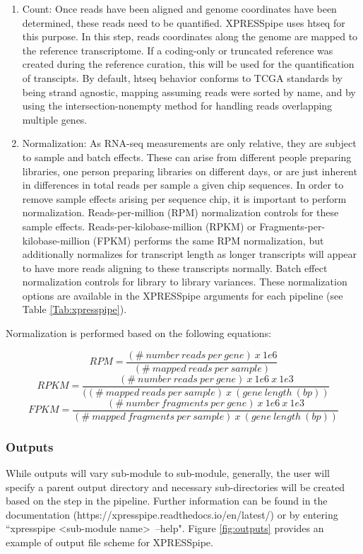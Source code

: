 \documentclass[11pt, a4paper, oneside]{article}
\begin{document}
\begin{enumerate}
  \item Count: Once reads have been aligned and genome coordinates have been determined, these reads need to be quantified. XPRESSpipe uses htseq{} for this purpose. In this step, reads coordinates along the genome are mapped to the reference transcriptome. If a coding-only or truncated reference was created during the reference curation, this will be used for the quantification of transcipts. By default, htseq behavior conforms to TCGA standards by being strand agnostic, mapping assuming reads were sorted by name, and by using the intersection-nonempty method for handling reads overlapping multiple genes.
  \item Normalization: As RNA-seq measurements are only relative, they are subject to sample and batch effects. These can arise from different people preparing libraries, one person preparing libraries on different days, or are just inherent in differences in total reads per sample a given chip sequences. In order to remove sample effects arising per sequence chip, it is important to perform normalization. Reads-per-million (RPM) normalization controls for these sample effects. Reads-per-kilobase-million (RPKM) or Fragments-per-kilobase-million (FPKM) performs the same RPM normalization, but additionally normalizes for transcript length as longer transcripts will appear to have more reads aligning to these transcripts normally. Batch effect normalization controls for library to library variances. These normalization options are available in the XPRESSpipe arguments for each pipeline (see Table \ref{Tab:xpresspipe}).
\end{enumerate}

Normalization is performed based on the following equations:

\[ RPM = \frac{(\#\ number\ reads\ per\ gene)\ x\ 1e6}{(\#\ mapped\ reads\ per\ sample)} \]
\[ RPKM = \frac{(\#\ number\ reads\ per\ gene)\ x\ 1e6\ x\ 1e3}{((\#\ mapped\ reads\ per\ sample)\ x\ (gene\ length\ (bp))} \]
\[ FPKM = \frac{(\#\ number\ fragments\ per\ gene)\ x\ 1e6\ x\ 1e3}{(\#\ mapped\ fragments\ per\ sample)\ x\ (gene\ length\ (bp))} \]

\subsubsection{Outputs}
While outputs will vary sub-module to sub-module, generally, the user will specify a parent output directory and necessary sub-directories will be created based on the step in the pipeline. Further information can be found in the documentation (https://xpresspipe.readthedocs.io/en/latest/) or by entering ``xpresspipe \textless sub-module name\textgreater \ --help". Figure \ref{fig:outputs} provides an example of output file scheme for XPRESSpipe.
\end{document}
